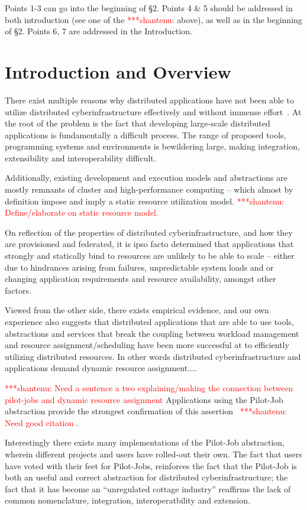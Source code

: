 \documentclass[conference,final]{IEEEtran}
\newcommand{\jhanote}[1]{ {\textcolor{red} { ***shantenu: #1 }}}
\newcommand{\jhanote}[1]{}
\begin{document}
Points 1-3 can go into the beginning of \S 2.  Points 4 \& 5 should be
addressed in both introduction (see one of the \jhanote{} above), as
well as in the beginning of \S 2. Points 6, 7 are addressed in the
Introduction.

\section{Introduction and Overview}

There exist multiple reasons why distributed applications have not
been able to utilize distributed cyberinfrastructure effectively and
without immense effort~\cite{dpa_surveypaper}.  
At the root of the problem is the fact that developing
large-scale distributed applications is fundamentally a difficult
process. The range of proposed tools, programming systems and
environments is bewildering large, making integration, extensibility
and interoperability difficult.  

Additionally, existing development and execution models and
abstractions are mostly remnants of cluster and high-performance
computing -- which almost by definition impose and imply a static
resource utilization model. \jhanote{Define/elaborate on static
  resource model.}  


On reflection of the properties of distributed cyberinfrastructure,
and how they are provisioned and federated, it is ipso facto
determined that applications that strongly and statically bind to
resources are unlikely to be able to scale -- either due to hindrances
arising from failures, unpredictable system loads and or changing
application requirements and resource availability, amongst other
factors.

Viewed from the other side, there exists empirical evidence, and our
own experience also suggests that distributed applications that are
able to use tools, abstractions and services that break the coupling
between workload management and resource assignment/scheduling have
been more successful at to efficiently utilizing distributed
resources.  In other words distributed cyberinfrastructure and
applications demand dynamic resource assignment.... 


\jhanote{Need a sentence a two explaining/making the connection
  between pilot-jobs and dynamic resource assignment} Applications
using the Pilot-Job abstraction provide the strongest confirmation of
this assertion~\cite{} \jhanote{Need good citation}.

Interestingly there exists many implementations of the Pilot-Job
abstraction, wherein different projects and users have rolled-out
their own. The fact that users have voted with their feet for
Pilot-Jobs, reinforces the fact that the Pilot-Job is both an useful
and correct abstraction for distributed cyberinfrastructure; the fact
that it has become an ``unregulated cottage industry'' reaffirms the
lack of common nomenclature, integration, interoperatbility and
extension.
\end{document}
